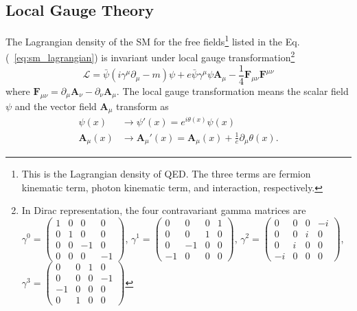 \subsection{Local Gauge Theory}
\label{subsec:sm_gauge_theory}
The Lagrangian density of the SM for the free fields\footnote{This is the Lagrangian density of QED. The three terms are fermion kinematic term, photon kinematic term, and interaction, respectively.} listed in the Eq.(~\ref{eq:sm_lagrangian}) is invariant under local gauge transformation\footnote{In Dirac representation, the four contravariant gamma matrices are $\gamma^{0} = \left(\begin{matrix}1 & 0 & 0 & 0\\0 & 1 & 0 & 0\\0 & 0 & -1 & 0\\0 & 0 & 0 & -1\end{matrix}\right)$, $\gamma^{1} = \left(\begin{matrix}0 & 0 & 0 & 1\\0 & 0 & 1 & 0\\0 & -1 & 0 & 0\\-1 & 0 & 0 & 0\end{matrix}\right)$, $\gamma^{2} = \left(\begin{matrix}0 & 0 & 0 & -i\\0 & 0 & i & 0\\0 & i & 0 & 0\\-i & 0 & 0 & 0\end{matrix}\right)$, $\gamma^{3} = \left(\begin{matrix}0 & 0 & 1 & 0\\0 & 0 & 0 & -1\\-1 & 0 & 0 & 0\\0 & 1 & 0 & 0\end{matrix}\right)$}
%
\begin{equation}
    \mathcal{L} = \bar{\psi}(i\gamma^{\mu}\partial_{\mu} - m)\psi + e\bar{\psi}\gamma^{\mu}\psi\bm{A}_{\mu} - \frac{1}{4}\bm{F}_{\mu\nu}\bm{F}^{\mu\nu}
    \label{eq:sm_lagrangian}
\end{equation}
%
where $\bm{F}_{\mu\nu} = \partial_{\mu}\bm{A}_{\nu} - \partial_{\nu}\bm{A}_{\mu}$.
The local gauge transformation means the scalar field $\psi$ and the vector field $\bm{A}_{\mu}$ transform as
%
\begin{align}
    \psi(x) & \rightarrow \psi'(x) = e^{i\theta(x)}\psi(x)\\
    \bm{A}_{\mu}(x) & \rightarrow \bm{A}_{\mu}'(x) = \bm{A}_{\mu}(x) + \frac{1}{e}\partial_{\mu}\theta(x).
    \label{eq:sm_gauge_transformation}
\end{align}
